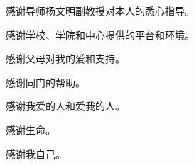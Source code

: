 
\begin{acknowledgements}
  感谢导师杨文明副教授对本人的悉心指导。

  感谢学校、学院和中心提供的平台和环境。

  感谢父母对我的爱和支持。

  感谢同门的帮助。

  感谢我爱的人和爱我的人。

  感谢生命。

  感谢我自己。



\end{acknowledgements}
